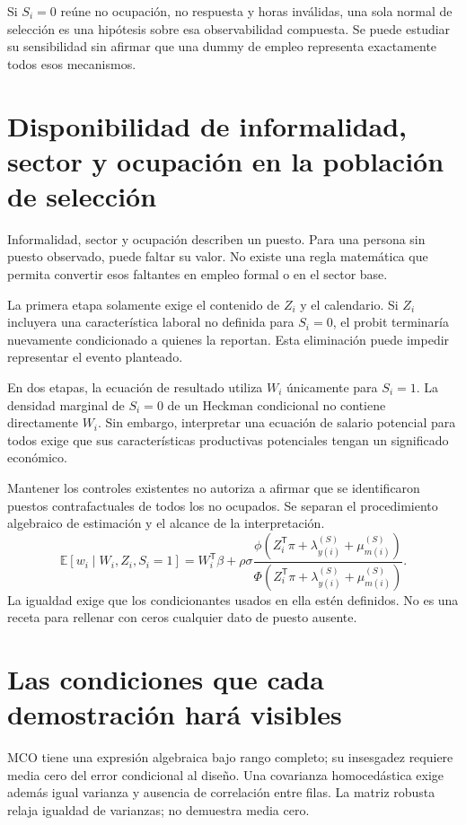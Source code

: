 \documentclass[11pt,a4paper]{article}
\newcommand{\E}{\mathbb E}
\begin{document}
Si $S_i=0$ reúne no ocupación, no respuesta y horas inválidas, una sola normal de selección es una hipótesis sobre esa observabilidad compuesta. Se puede estudiar su sensibilidad sin afirmar que una dummy de empleo representa exactamente todos esos mecanismos.

\clearpage
\section{Disponibilidad de informalidad, sector y ocupación en la población de selección}

Informalidad, sector y ocupación describen un puesto. Para una persona sin puesto observado, puede faltar su valor. No existe una regla matemática que permita convertir esos faltantes en empleo formal o en el sector base.

La primera etapa solamente exige el contenido de $Z_i$ y el calendario. Si $Z_i$ incluyera una característica laboral no definida para $S_i=0$, el probit terminaría nuevamente condicionado a quienes la reportan. Esta eliminación puede impedir representar el evento planteado.

En dos etapas, la ecuación de resultado utiliza $W_i$ únicamente para $S_i=1$. La densidad marginal de $S_i=0$ de un Heckman condicional no contiene directamente $W_i$. Sin embargo, interpretar una ecuación de salario potencial para todos exige que sus características productivas potenciales tengan un significado económico.

Mantener los controles existentes no autoriza a afirmar que se identificaron puestos contrafactuales de todos los no ocupados. Se separan el procedimiento algebraico de estimación y el alcance de la interpretación.
\[
\E[w_i\mid W_i,Z_i,S_i=1]
=W_i^{\mathsf T}\beta+\rho\sigma
\frac{\phi(Z_i^{\mathsf T}\pi+\lambda_{y(i)}^{(S)}+\mu_{m(i)}^{(S)})}
{\Phi(Z_i^{\mathsf T}\pi+\lambda_{y(i)}^{(S)}+\mu_{m(i)}^{(S)})}.
\]
La igualdad exige que los condicionantes usados en ella estén definidos. No es una receta para rellenar con ceros cualquier dato de puesto ausente.

\clearpage
\section{Las condiciones que cada demostración hará visibles}

MCO tiene una expresión algebraica bajo rango completo; su insesgadez requiere media cero del error condicional al diseño. Una covarianza homocedástica exige además igual varianza y ausencia de correlación entre filas. La matriz robusta relaja igualdad de varianzas; no demuestra media cero.
\end{document}
